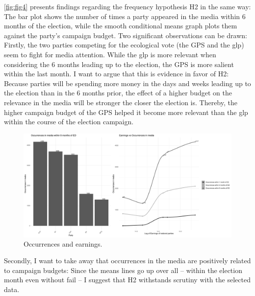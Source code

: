 \documentclass[11pt,a4paper]{article}
\begin{document}
\autoref{fig:fig4} presents findings regarding the frequency hypothesis H2 in the same way: The bar plot shows the number of times a party appeared in the media within 6 months of the election, while the smooth conditional means graph plots them against the party’s campaign budget. Two significant observations can be drawn: Firstly, the two parties competing for the ecological vote (the GPS and the glp) seem to fight for media attention. While the glp is more relevant when considering the 6 months leading up to the election, the GPS is more salient within the last month. I want to argue that this is evidence in favor of H2: Because parties will be spending more money in the days and weeks leading up to the election than in the 6 months prior, the effect of a higher budget on the relevance in the media will be stronger the closer the election is. Thereby, the higher campaign budget of the GPS helped it become more relevant than the glp within the course of the election campaign. 
\begin{figure}
    \centering
    \includegraphics[width=1\linewidth]{output/plots/plot_figure_4.png}
    \caption{Occurrences and earnings.}
    \label{fig:fig4}
\end{figure}

Secondly, I want to take away that occurrences in the media are positively related to campaign budgets: Since the means lines go up over all – within the election month even without fail – I suggest that H2 withstands scrutiny with the selected data.
\end{document}
